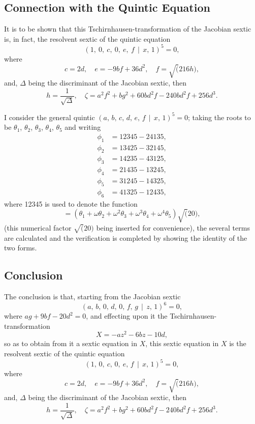 \documentclass[11pt,a4paper]{book}
\begin{document}
\subsection*{Connection with the Quintic Equation}

It is to be shown that this Tschirnhausen-transformation of the Jacobian sextic is, in fact, the resolvent sextic of the quintic equation
\[
(1,\ 0,\ c,\ 0,\ e,\ f \,\!\!\mid\!\!\, x,\, 1)^{5} = 0,
\]
where
\[
c = 2d,\quad e = -9bf + 36d^{2},\quad f = \surd(216h),
\]
and, $\Delta$ being the discriminant of the Jacobian sextic, then
\[
h = \frac{1}{\sqrt{\Delta}},\quad \zeta = a^{2}f^{2} + bg^{2} + 60bd^{2}f - 240bd^{2}f + 256d^{3}.
\]

I consider the general quintic $(a,\, b,\, c,\, d,\, e,\, f \,\!\!\mid\!\!\, x,\, 1)^{5} = 0$; taking the roots to be $\theta_{1}$, $\theta_{2}$, $\theta_{3}$, $\theta_{4}$, $\theta_{5}$ and writing
\begin{align*}
\phi_{1} &= 12345 - 24135,\\
\phi_{2} &= 13425 - 32145,\\
\phi_{3} &= 14235 - 43125,\\
\phi_{4} &= 21435 - 13245,\\
\phi_{5} &= 31245 - 14325,\\
\phi_{6} &= 41325 - 12435,
\end{align*}
where 12345 is used to denote the function
\[
=(\theta_{1}+\omega\theta_{2}+\omega^{2}\theta_{3}+\omega^{3}\theta_{4}+\omega^{4}\theta_{5})\surd(20),
\]
(this numerical factor $\surd(20)$ being inserted for convenience), the several terms are calculated and the verification is completed by showing the identity of the two forms.

\subsection*{Conclusion}

The conclusion is that, starting from the Jacobian sextic
\[
(a,\, b,\, 0,\, d,\, 0,\, f,\, g \,\!\!\mid\!\!\, z,\, 1)^{6} = 0,
\]
where $ag + 9bf - 20d^{2} = 0$, and effecting upon it the Tschirnhausen-transformation
\[
X = -az^{2} - 6bz - 10d,
\]
so as to obtain from it a sextic equation in $X$, this sextic equation in $X$ is the resolvent sextic of the quintic equation
\[
(1,\, 0,\ c,\, 0,\ e,\, f \,\!\!\mid\!\!\, x,\, 1)^{5} = 0,
\]
where
\[
c = 2d,\quad e = -9bf + 36d^{2},\quad f = \surd(216h),
\]
and, $\Delta$ being the discriminant of the Jacobian sextic, then
\[
h = \frac{1}{\sqrt{\Delta}},\quad \zeta = a^{2}f^{2} + bg^{2} + 60bd^{2}f - 240bd^{2}f + 256d^{3}.
\]
\end{document}
